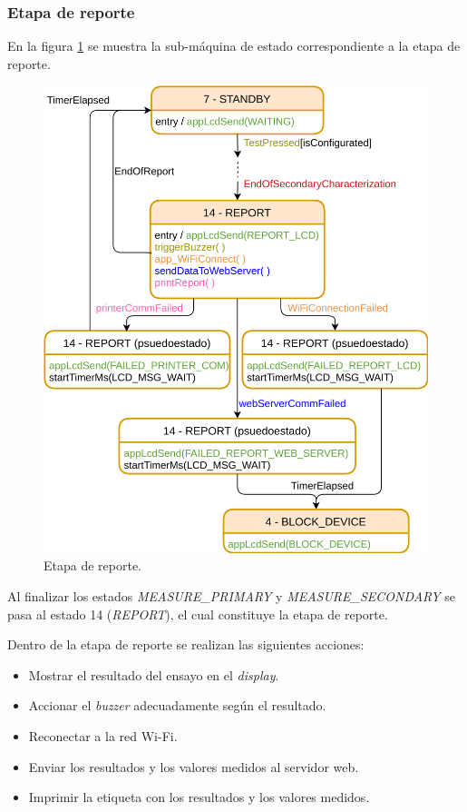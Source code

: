 \subsubsection{Etapa de reporte}
\label{subsubsec:EtRep}

En la figura \ref{fig:MainFSM_4} se muestra la sub-máquina de estado correspondiente a la etapa de reporte. 

\begin{figure}[htpb]
	\centering
	\includegraphics[scale=1]{./Figures/MainFSM_4.png}
	\caption{Etapa de reporte.}
	\label{fig:MainFSM_4}
\end{figure}

Al finalizar los estados \textit{MEASURE\_PRIMARY} y \textit{MEASURE\_SECONDARY} se pasa al estado 14 (\textit{REPORT}), el cual constituye la etapa de reporte.

Dentro de la etapa de reporte se realizan las siguientes acciones:
\begin{itemize}
\item Mostrar el resultado del ensayo en el \textit{display}.
\item Accionar el \textit{buzzer} adecuadamente según el resultado.
\item Reconectar a la red Wi-Fi.
\item Enviar los resultados y los valores medidos al servidor web.
\item Imprimir la etiqueta con los resultados y los valores medidos.
\end{itemize}


